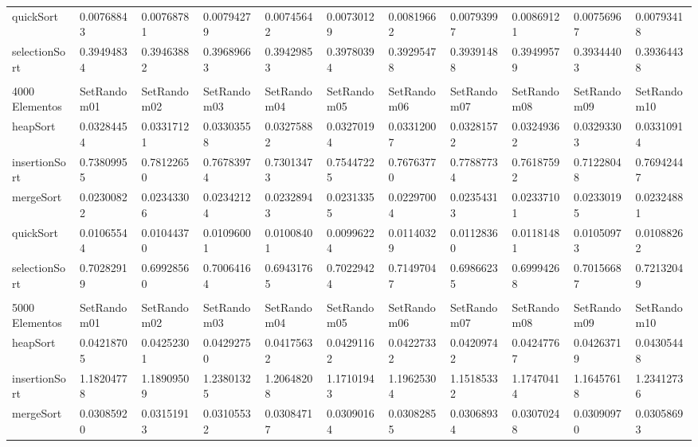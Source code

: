 \documentclass[article,a4paper]{article}
\begin{document}
\begin{table}[h]
{\begin{tabular}{lllllllllll}
quickSort       & 0.00768843  & 0.00768781  & 0.00794279  & 0.00745642  & 0.00730129  & 0.00819662  & 0.00793997  & 0.00869121  & 0.00756967  & 0.00793418  \\
selectionSort   & 0.39494834  & 0.39463882  & 0.39689663  & 0.39429853  & 0.39780394  & 0.39295478  & 0.39391488  & 0.39499579  & 0.39344403  & 0.39364438  \\
                &             &             &             &             &             &             &             &             &             &             \\
4000 Elementos  & SetRandom01 & SetRandom02 & SetRandom03 & SetRandom04 & SetRandom05 & SetRandom06 & SetRandom07 & SetRandom08 & SetRandom09 & SetRandom10 \\
heapSort        & 0.03284454  & 0.03317121  & 0.03303558  & 0.03275882  & 0.03270194  & 0.03312007  & 0.03281572  & 0.03249362  & 0.03293303  & 0.03310914  \\
insertionSort   & 0.73809955  & 0.78122650  & 0.76783974  & 0.73013473  & 0.75447225  & 0.76763770  & 0.77887734  & 0.76187592  & 0.71228048  & 0.76942447  \\
mergeSort       & 0.02300822  & 0.02343306  & 0.02342124  & 0.02328943  & 0.02313355  & 0.02297004  & 0.02354313  & 0.02337101  & 0.02330195  & 0.02324881  \\
quickSort       & 0.01065544  & 0.01044370  & 0.01096001  & 0.01008401  & 0.00996224  & 0.01140329  & 0.01128360  & 0.01181481  & 0.01050973  & 0.01088262  \\
selectionSort   & 0.70282919  & 0.69928560  & 0.70064164  & 0.69431765  & 0.70229424  & 0.71497047  & 0.69866235  & 0.69994268  & 0.70156687  & 0.72132049  \\
                &             &             &             &             &             &             &             &             &             &             \\
5000 Elementos  & SetRandom01 & SetRandom02 & SetRandom03 & SetRandom04 & SetRandom05 & SetRandom06 & SetRandom07 & SetRandom08 & SetRandom09 & SetRandom10 \\
heapSort        & 0.04218705  & 0.04252301  & 0.04292750  & 0.04175632  & 0.04291162  & 0.04227332  & 0.04209742  & 0.04247767  & 0.04263719  & 0.04305448  \\
insertionSort   & 1.18204778  & 1.18909509  & 1.23801325  & 1.20648208  & 1.17101943  & 1.19625304  & 1.15185332  & 1.17470414  & 1.16457618  & 1.23412736  \\
mergeSort       & 0.03085920  & 0.03151913  & 0.03105532  & 0.03084717  & 0.03090164  & 0.03082855  & 0.03068934  & 0.03070248  & 0.03090970  & 0.03058693  \\

\end{tabular}}
\end{table}
\end{document}

